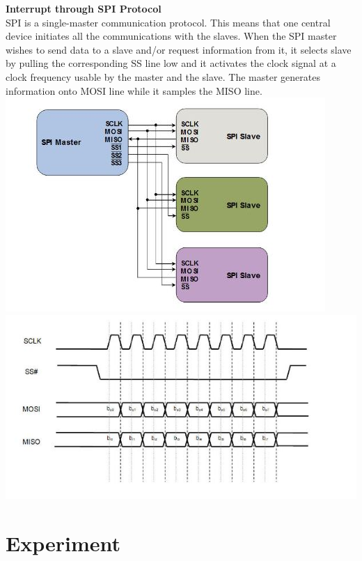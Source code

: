 \documentclass[11pt,a4paper]{article}
\begin{document}
	  \textbf{Interrupt through SPI Protocol} \\
	  
	  SPI is a single-master communication protocol. This means that one central device initiates all the communications with the slaves. When the SPI master wishes to send data to a slave and/or request information from it, it selects slave by pulling the corresponding SS line low and it activates the clock signal at a clock frequency usable by the master and the slave. The master generates information onto MOSI line while it samples the MISO line.\newline
	  \includegraphics[scale=0.8]{SPI.jpg}
	  \vspace{5mm}
	  \includegraphics[scale=0.7]{SPI1.jpg}
	\section{Experiment}
	
\end{document}
